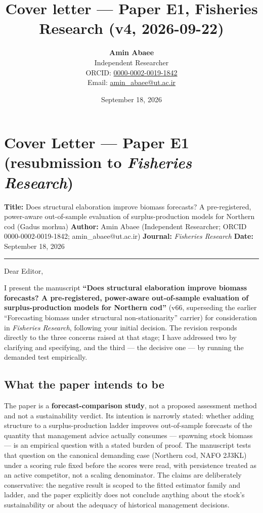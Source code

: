 \documentclass[11pt]{article}
\title{Cover letter — Paper E1, Fisheries Research (v4, 2026-09-22)}
\author{\textbf{Amin Abaee}\\ Independent Researcher\\[2pt] ORCID: \href{https://orcid.org/0000-0002-0019-1842}{0000-0002-0019-1842}\\ Email: \href{mailto:amin_abaee@ut.ac.ir}{amin_abaee@ut.ac.ir}}
\date{September 18, 2026}
\begin{document}
\maketitle

\section{\texorpdfstring{Cover Letter --- Paper E1 (resubmission to
\emph{Fisheries
Research})}{Cover Letter --- Paper E1 (resubmission to Fisheries Research)}}\label{cover-letter-paper-e1-resubmission-to-fisheries-research}

\textbf{Title:} Does structural elaboration improve biomass forecasts? A
pre-registered, power-aware out-of-sample evaluation of
surplus-production models for Northern cod (Gadus morhua)
\textbf{Author:} Amin Abaee (Independent Researcher; ORCID
0000-0002-0019-1842; amin\_abaee@ut.ac.ir) \textbf{Journal:}
\emph{Fisheries Research} \textbf{Date:} September 18, 2026

\begin{center}\rule{0.5\linewidth}{0.5pt}\end{center}

Dear Editor,

I present the manuscript \textbf{``Does structural elaboration improve
biomass forecasts? A pre-registered, power-aware out-of-sample
evaluation of surplus-production models for Northern cod''} (v66,
superseding the earlier ``Forecasting biomass under structural
non-stationarity'' carrier) for consideration in \emph{Fisheries
Research}, following your initial decision. The revision responds
directly to the three concerns raised at that stage; I have addressed
two by clarifying and specifying, and the third --- the decisive one ---
by running the demanded test empirically.

\subsection{What the paper intends to
be}\label{what-the-paper-intends-to-be}

The paper is a \textbf{forecast-comparison study}, not a proposed
assessment method and not a sustainability verdict. Its intention is
narrowly stated: whether adding structure to a surplus-production ladder
improves out-of-sample forecasts of the quantity that management advice
actually consumes --- spawning stock biomass --- is an empirical
question with a stated burden of proof. The manuscript tests that
question on the canonical demanding case (Northern cod, NAFO 2J3KL)
under a scoring rule fixed before the scores were read, with persistence
treated as an active competitor, not a scaling denominator. The claims
are deliberately conservative: the negative result is scoped to the
fitted estimator family and ladder, and the paper explicitly does not
conclude anything about the stock's sustainability or about the adequacy
of historical management decisions.
\end{document}
